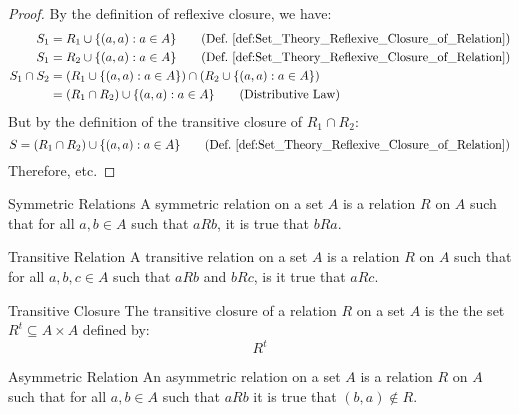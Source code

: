 \documentclass[crop=false,class=book,oneside]{standalone}
\begin{document}
        \begin{proof}
            By the definition of reflexive closure, we have:
            \begin{align}
                S_{1}&=R_{1}\cup\{(a,a):a\in{A}\}
                \tag{Def.~\ref{def:Set_Theory_Reflexive_%
                               Closure_of_Relation}}\\
                S_{1}&=R_{2}\cup\{(a,a):a\in{A}\}
                \tag{Def.~\ref{def:Set_Theory_Reflexive_%
                               Closure_of_Relation}}\\
                \nonumber
                S_{1}\cap{S}_{2}&=
                (R_{1}\cup\{(a,a):a\in{A}\})
                \cap(R_{2}\cup\{(a,a):a\in{A}\})\\
                &=(R_{1}\cap{R}_{2})
                \cup\{(a,a):a\in{A}\}
                \tag{Distributive Law}
            \end{align}
            But by the definition of the transitive closure of
            $R_{1}\cap{R}_{2}$:
            \begin{equation}
                S=(R_{1}\cap{R}_{2})\cup\{(a,a):a\in{A}\}
                \tag{Def.~\ref{def:Set_Theory_Reflexive_%
                               Closure_of_Relation}}
            \end{equation}
            Therefore, etc.
        \end{proof}
        \begin{ldefinition}{Symmetric Relations}
            A symmetric relation on a set $A$ is a
            relation $R$ on $A$ such that for all $a,b\in{A}$
            such that $aRb$, it is true that $bRa$.
        \end{ldefinition}
        \begin{ldefinition}{Transitive Relation}
            A transitive relation on a set $A$ is a relation $R$ on $A$
            such that for all $a,b,c\in{A}$ such that $aRb$ and $bRc$,
            is it true that $aRc$.
        \end{ldefinition}
        \begin{ldefinition}{Transitive Closure}
            The transitive closure of a relation $R$ on a set
            $A$ is the the set $R^{t}\subseteq{A}\times{A}$ defined by:
            \begin{equation}
                R^{t}
            \end{equation}
        \end{ldefinition}
        \begin{ldefinition}{Asymmetric Relation}
            An asymmetric relation on a set $A$ is a relation $R$
            on $A$ such that for all $a,b\in{A}$ such that $aRb$
            it is true that $(b,a)\notin{R}$.
        \end{ldefinition}
\end{document}
